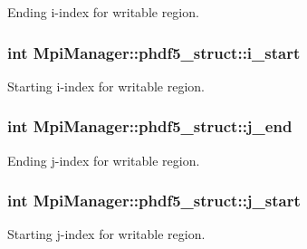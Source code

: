 Ending i-\/index for writable region. 

\subsubsection[{\texorpdfstring{i\+\_\+start}{i_start}}]{\setlength{\rightskip}{0pt plus 5cm}int Mpi\+Manager\+::phdf5\+\_\+struct\+::i\+\_\+start}\hypertarget{struct_mpi_manager_1_1phdf5__struct_a971e8f56e0d69005cb639a74250bbb70}{}\label{struct_mpi_manager_1_1phdf5__struct_a971e8f56e0d69005cb639a74250bbb70}


Starting i-\/index for writable region. 

\subsubsection[{\texorpdfstring{j\+\_\+end}{j_end}}]{\setlength{\rightskip}{0pt plus 5cm}int Mpi\+Manager\+::phdf5\+\_\+struct\+::j\+\_\+end}\hypertarget{struct_mpi_manager_1_1phdf5__struct_ac8869bc50d30230032e13dd5bfe7d1fe}{}\label{struct_mpi_manager_1_1phdf5__struct_ac8869bc50d30230032e13dd5bfe7d1fe}


Ending j-\/index for writable region. 

\subsubsection[{\texorpdfstring{j\+\_\+start}{j_start}}]{\setlength{\rightskip}{0pt plus 5cm}int Mpi\+Manager\+::phdf5\+\_\+struct\+::j\+\_\+start}\hypertarget{struct_mpi_manager_1_1phdf5__struct_aff0715d84f3e46f8cca3a380add110e3}{}\label{struct_mpi_manager_1_1phdf5__struct_aff0715d84f3e46f8cca3a380add110e3}


Starting j-\/index for writable region. 

